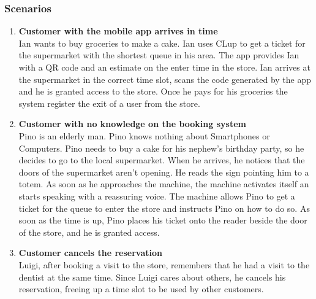 \subsubsection{Scenarios}
    \begin{enumerate}[label=\Alph*.]
        \item \textbf{Customer with the mobile app arrives in time}\\
            Ian wants to buy groceries to make a cake. Ian uses CLup to get a ticket for the supermarket with the shortest queue in his area.
            The app provides Ian with a QR code and an estimate on the enter time in the store. 
            Ian arrives at the supermarket in the correct time slot, scans the code generated by the app and he is granted access to the store. Once he pays for his groceries the system register the exit of a user from the store. 

        \item \textbf{Customer with no knowledge on the booking system}\\
            Pino is an elderly man. Pino knows nothing about Smartphones or Computers. Pino needs to buy a cake for his
            nephew's birthday party, so he decides to go to the local supermarket. When he arrives, he notices that the doors of the supermarket
            aren't opening. He reads the sign pointing him to a totem. 
            As soon as he approaches the machine, the machine activates itself an starts speaking with a reassuring voice. 
            The machine allows Pino to get a ticket for the queue to enter the store and instructs Pino on how to do so. 
            As soon as the time is up, Pino places his ticket onto the reader beside the door of the store, and he is granted access. 

        \item \textbf{Customer cancels the reservation}\\
            Luigi, after booking a visit to the store, remembers that he had a visit to the dentist at the same time.
            Since Luigi cares about others, he cancels his reservation, freeing up a time slot to be used by other customers.


\end{enumerate}
